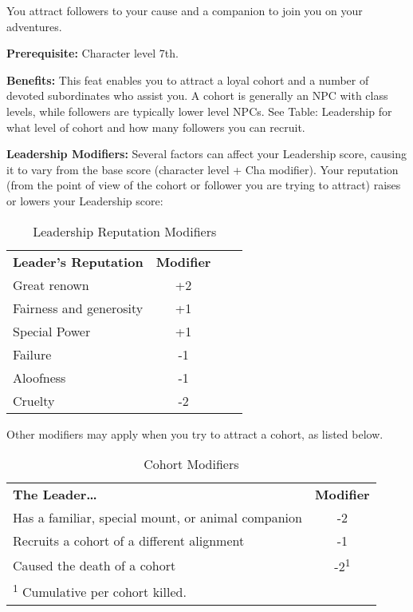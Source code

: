 				
You attract followers to your cause and a companion to join you on your adventures.
				
\textbf{Prerequisite:} Character level 7th.
				
\textbf{Benefits:} This feat enables you to attract a loyal cohort and a number of devoted subordinates who assist you. A cohort is generally an NPC with class levels, while followers are typically lower level NPCs. See Table: Leadership for what level of cohort and how many followers you can recruit.
				
\textbf{Leadership Modifiers:} Several factors can affect your Leadership score, causing it to vary from the base score (character level + Cha modifier). Your reputation (from the point of view of the cohort or follower you are trying to attract) raises or lowers your Leadership score:
				
\begin{table}[htb]
\sffamily
{}
\caption{Leadership Reputation Modifiers}
\centering
\begin{tabular}{lccc}
\textbf{Leader's Reputation} & \textbf{Modifier}\\
Great renown & +2\\
Fairness and generosity & +1\\
Special Power & +1\\
Failure & -1 \\
Aloofness & -1\\
Cruelty & -2\\
\end{tabular}
\end{table}
				
Other modifiers may apply when you try to attract a cohort, as listed below.\newline

\begin{table}[htb]
\sffamily
{}
\caption{Cohort Modifiers}
\centering
\begin{tabular}{lc}
\textbf{The Leader\ldots{}} & \textbf{Modifier}\\
Has a familiar, special mount, or animal companion & -2\\
Recruits a cohort of a different alignment & -1\\
Caused the death of a cohort & -2\textsuperscript{1}\\
\multicolumn{2}{l}{\textsuperscript{1} Cumulative per cohort killed.}\\
\end{tabular}
\end{table}


